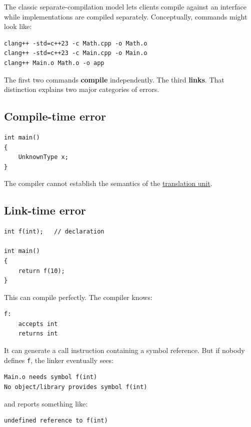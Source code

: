 The classic separate-compilation model lets clients compile against an interface while implementations are compiled separately. Conceptually, commands might look like:

\begin{verbatim}
clang++ -std=c++23 -c Math.cpp -o Math.o
clang++ -std=c++23 -c Main.cpp -o Main.o
clang++ Main.o Math.o -o app
\end{verbatim}

The first two commands \textbf{compile} independently. The third \textbf{links}. That distinction explains two major categories of errors.

\subsection{Compile-time error}\label{05-engine-i-ch002-compile-time-error}

\begin{verbatim}
int main()
{
    UnknownType x;
}
\end{verbatim}

The compiler cannot establish the semantics of the \hyperref[appendix-806686359e1b]{translation unit}.

\subsection{Link-time error}\label{05-engine-i-ch002-link-time-error}

\begin{verbatim}
int f(int);   // declaration

int main()
{
    return f(10);
}
\end{verbatim}

This can compile perfectly. The compiler knows:

\begin{verbatim}
f:
    accepts int
    returns int
\end{verbatim}

It can generate a call instruction containing a symbol reference. But if nobody defines \texttt{f}, the linker eventually sees:

\begin{verbatim}
Main.o needs symbol f(int)
No object/library provides symbol f(int)
\end{verbatim}

and reports something like:

\begin{verbatim}
undefined reference to f(int)
\end{verbatim}

